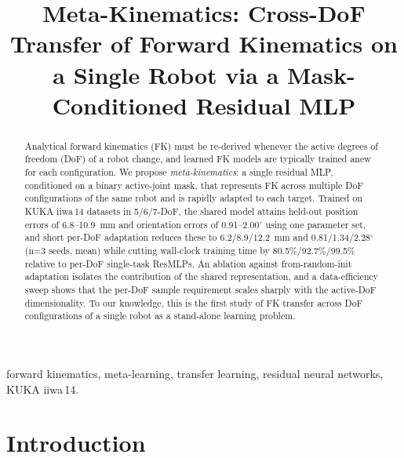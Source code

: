 \documentclass[conference]{IEEEtran}
\begin{document}
\title{Meta-Kinematics: Cross-DoF Transfer of Forward Kinematics on a Single Robot via a Mask-Conditioned Residual MLP}

\author{
\and
{}
}

\maketitle

\begin{abstract}
Analytical forward kinematics (FK) must be re-derived whenever the active degrees of freedom (DoF) of a robot change, and learned FK models are typically trained anew for each configuration. We propose \emph{meta-kinematics}: a single residual MLP, conditioned on a binary active-joint mask, that represents FK across multiple DoF configurations of the same robot and is rapidly adapted to each target. Trained on KUKA iiwa\,14 datasets in 5/6/7-DoF, the shared model attains held-out position errors of 6.8--10.9~mm and orientation errors of 0.91--2.00$^\circ$ using one parameter set, and short per-DoF adaptation reduces these to 6.2/8.9/12.2~mm and 0.81/1.34/2.28$^\circ$ (n=3 seeds, mean) while cutting wall-clock training time by 80.5\%/92.7\%/99.5\% relative to per-DoF single-task ResMLPs. An ablation against from-random-init adaptation isolates the contribution of the shared representation, and a data-efficiency sweep shows that the per-DoF sample requirement scales sharply with the active-DoF dimensionality. To our knowledge, this is the first study of FK transfer across DoF configurations of a single robot as a stand-alone learning problem.
\end{abstract}

\begin{IEEEkeywords}
forward kinematics, meta-learning, transfer learning, residual neural networks, KUKA iiwa\,14.
\end{IEEEkeywords}

\section{Introduction}
\end{document}
